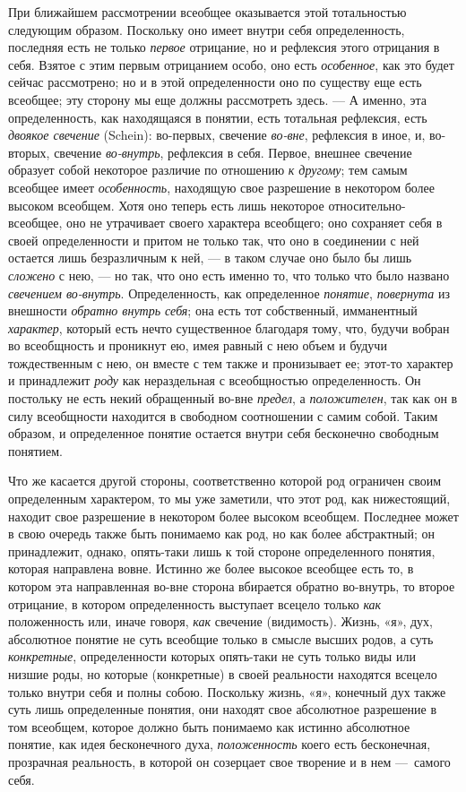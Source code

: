 \documentclass[twoside]{article}
\begin{document}
{{При ближайшем рассмотрении всеобщее оказывается этой
тотальностью следующим образом. Поскольку оно имеет внутри себя
определенность, последняя есть не только
{\em первое} отрицание,
но и рефлексия этого отрицания в себя. Взятое с этим первым отрицанием
особо, оно есть {\em особенное},
как это будет сейчас рассмотрено; но и в этой определенности
оно по существу еще есть всеобщее; эту сторону мы еще должны рассмотреть
здесь. — \label{bkm:bm23a}А именно, эта определенность, как
находящаяся в понятии, есть тотальная рефлексия, есть
{\em двоякое свечение} (Schein):
во-первых, свечение
{\em во-вне}, рефлексия в
иное, и, во-вторых, свечение
{\em во-внутрь},
рефлексия в себя. Первое, внешнее свечение образует собой
некоторое различие по отношению {\em к
другому}; тем самым всеобщее имеет
{\em особенность},
находящую свое разрешение в некотором более высоком всеобщем.
Хотя оно теперь есть лишь некоторое относительно-всеобщее, оно не
утрачивает своего характера всеобщего; оно сохраняет себя в своей
определенности и притом не только так, что оно в соединении с ней остается
лишь безразличным к ней, — в таком случае оно было бы лишь
{\em сложено} с нею, —
но так, что оно есть именно то, что только что было названо
{\em свечением во-внутрь}.
Определенность, как определенное
{\em понятие},
{\em повернута} из
внешности {\em обратно внутрь себя};
она есть тот собственный, имманентный
{\em характер}, который
есть нечто существенное благодаря тому, что, будучи вобран во всеобщность и
проникнут ею, имея равный с нею объем и будучи тождественным с нею, он
вместе с тем также и пронизывает ее; этот-то характер и принадлежит
{\em роду} как
нераздельная с всеобщностью определенность. Он постольку не есть некий
обращенный во-вне {\em предел},
а {\em положителен},
так как он в силу всеобщности находится в свободном
соотношении с самим собой. Таким образом, и определенное понятие остается
внутри себя бесконечно свободным понятием.

Что же касается другой стороны, соответственно которой род
ограничен своим определенным характером, то мы уже заметили, что
этот род, как нижестоящий, находит свое разрешение в
некотором более высоком всеобщем. Последнее может в свою очередь также быть
понимаемо как род, но как более абстрактный; он принадлежит, однако,
опять-таки лишь к той стороне определенного понятия, которая направлена
вовне. Истинно же более высокое всеобщее есть то, в котором эта
направленная во-вне сторона вбирается обратно во-внутрь, то второе
отрицание, в котором определенность выступает всецело только
{\em как} положенность
или, иначе говоря, {\em как}
свечение (видимость). Жизнь, «я», дух, абсолютное понятие не
суть всеобщие только в смысле высших родов, а суть
{\em конкретные},
определенности которых опять-таки не суть только виды или
низшие роды, но которые (конкретные) в своей реальности находятся всецело
только внутри себя и полны собою. Поскольку жизнь, «я», конечный дух также
суть лишь определенные понятия, они находят свое абсолютное разрешение в
том всеобщем, которое должно быть понимаемо как истинно абсолютное понятие,
как идея бесконечного духа,
{\em положенность} коего
есть бесконечная, прозрачная реальность, в которой он созерцает свое
творение и в нем —~самого себя.

}}
\end{document}
